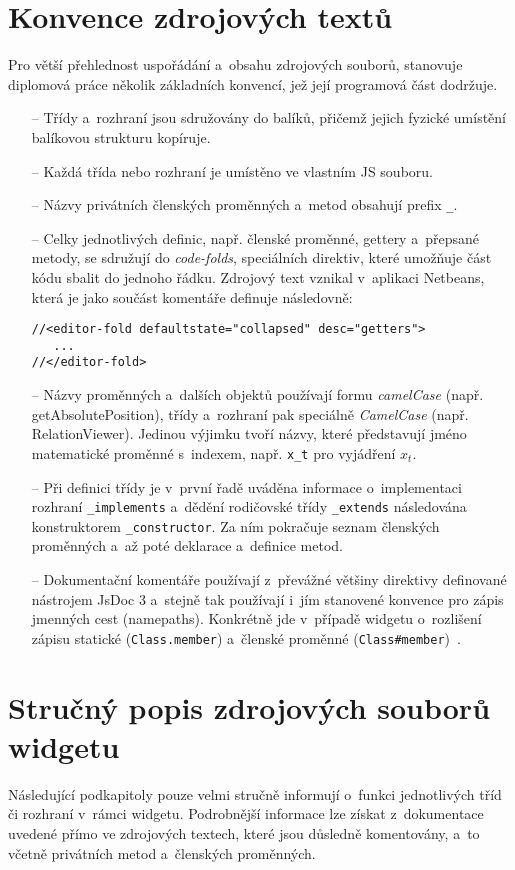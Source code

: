 		\section{Konvence zdrojových textů}
		Pro větší přehlednost uspořádání a~obsahu zdrojových souborů, stanovuje diplomová práce několik základních konvencí, jež její programová část dodržuje.
		\begin{itemize}
			\item[--] Třídy a~rozhraní jsou sdružovány do balíků, přičemž jejich fyzické umístění balíkovou strukturu kopíruje.
			\item[--] Každá třída nebo rozhraní je umístěno ve vlastním JS souboru.
			\item[--] Názvy privátních členských proměnných a~metod obsahují prefix {\tt \_}.
			\item[--] Celky jednotlivých definic, např. členské proměnné, gettery a~přepsané metody, se sdružují do \emph{code-folds}, speciálních direktiv, které umožňuje část kódu sbalit do jednoho řádku. Zdrojový text vznikal v~aplikaci {\sf Netbeans}, která je jako součást komentáře definuje následovně:
			\begin{verbatim}
//<editor-fold defaultstate="collapsed" desc="getters">
   ...
//</editor-fold>
			\end{verbatim}
			\item[--] Názvy proměnných a~dalších objektů používají formu \emph{camelCase} (např. getAbsolutePosition), třídy a~rozhraní pak speciálně \emph{CamelCase} (např. RelationViewer). Jedinou výjimku tvoří názvy, které představují jméno matematické proměnné s~indexem, např. {\tt x\_t} pro vyjádření $x_t$.
			\item[--] Při definici třídy je v~první řadě uváděna informace o~implementaci rozhraní {\tt \_implements} a~dědění rodičovské třídy {\tt \_extends} následována konstruktorem {\tt \_constructor}. Za ním pokračuje seznam členských proměnných a~až poté deklarace a~definice metod.
			\item[--] Dokumentační komentáře používají z~převážné většiny direktivy definované nástrojem {\sf JsDoc 3} a~stejně tak používají i~jím stanovené konvence pro zápis jmenných cest (namepaths). Konkrétně jde v~případě widgetu o~rozlišení zápisu statické ({\tt Class.member}) a~členské proměnné ({\tt Class\#member})~\cite{jsdoc}.
		\end{itemize}
		
		\section{Stručný popis zdrojových souborů widgetu}
			Následující podkapitoly pouze velmi stručně informují o~funkci jednotlivých tříd či rozhraní v~rámci widgetu. Podrobnější informace lze získat z~dokumentace uvedené přímo ve zdrojových textech, které jsou důsledně komentovány, a~to včetně privátních metod a~členských proměnných.
			
